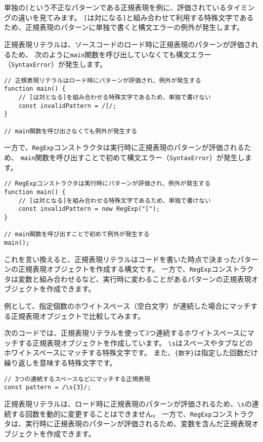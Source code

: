 単独の\texttt{[}という不正なパターンである正規表現を例に、評価されているタイミングの違いを見てみます。
\texttt{[}は対になる\texttt{]}と組み合わせて利用する特殊文字であるため、正規表現のパターンに単独で書くと構文エラーの例外が発生します。

正規表現リテラルは、ソースコードのロード時に正規表現のパターンが評価されるため、
次のように\texttt{main}関数を呼び出していなくても構文エラー（\texttt{SyntaxError}）が発生します。

\begin{lstlisting}
// 正規表現リテラルはロード時にパターンが評価され、例外が発生する
function main() {
    // [は対となる]を組み合わせる特殊文字であるため、単独で書けない
    const invalidPattern = /[/;
}

// main関数を呼び出さなくても例外が発生する
\end{lstlisting}

一方で、\texttt{RegExp}コンストラクタは実行時に正規表現のパターンが評価されるため、
\texttt{main}関数を呼び出すことで初めて構文エラー（\texttt{SyntaxError}）が発生します。

\begin{lstlisting}
// RegExpコンストラクタは実行時にパターンが評価され、例外が発生する
function main() {
    // [は対となる]を組み合わせる特殊文字であるため、単独で書けない
    const invalidPattern = new RegExp("[");
}

// main関数を呼び出すことで初めて例外が発生する
main();
\end{lstlisting}

これを言い換えると、正規表現リテラルはコードを書いた時点で決まったパターンの正規表現オブジェクトを作成する構文です。
一方で、\texttt{RegExp}コンストラクタは変数と組み合わせるなど、実行時に変わることがあるパターンの正規表現オブジェクトを作成できます。

例として、指定個数のホワイトスペース（空白文字）が連続した場合にマッチする正規表現オブジェクトで比較してみます。

次のコードでは、正規表現リテラルを使って3つ連続するホワイトスペースにマッチする正規表現オブジェクトを作成しています。
\texttt{\textbackslash s}はスペースやタブなどのホワイトスペースにマッチする特殊文字です。
また、\texttt{\{数字\}}は指定した回数だけ繰り返しを意味する特殊文字です。

\begin{lstlisting}
// 3つの連続するスペースなどにマッチする正規表現
const pattern = /\s{3}/;
\end{lstlisting}

正規表現リテラルは、ロード時に正規表現のパターンが評価されるため、\texttt{\textbackslash s}の連続する回数を動的に変更することはできません。
一方で、\texttt{RegExp}コンストラクタは、実行時に正規表現のパターンが評価されるため、変数を含んだ正規表現オブジェクトを作成できます。

